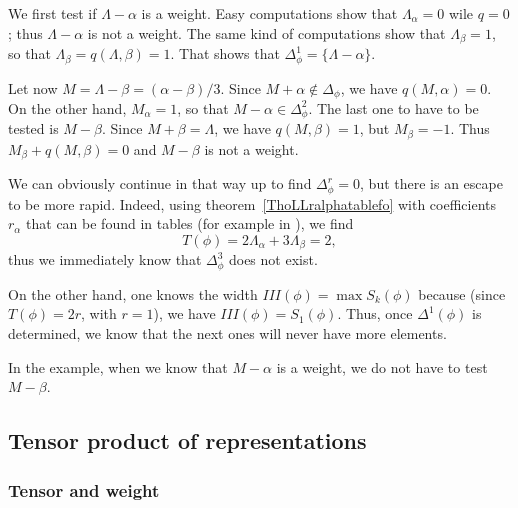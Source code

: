 We first test if $\Lambda-\alpha$ is a weight. Easy computations show that  $\Lambda_{\alpha}=0$ wile $q=0$; thus $\Lambda-\alpha$ is not a weight. The same kind of computations show that $\Lambda_{\beta}=1$, so that $\Lambda_{\beta}=q(\Lambda,\beta)=1$. That shows that $\Delta_{\phi}^1=\{ \Lambda-\alpha \}$.

Let now $M=\Lambda-\beta=(\alpha-\beta)/3$. Since $M+\alpha\notin\Delta_{\phi}$, we have $q(M,\alpha)=0$. On the other hand, $M_{\alpha}=1$, so that $M-\alpha\in\Delta_{\phi}^2$. The last one to have to be tested is $M-\beta$. Since $M+\beta=\Lambda$, we have $q(M,\beta)=1$, but $M_{\beta}=-1$. Thus $M_{\beta}+q(M,\beta)=0$ and $M-\beta$ is not a weight.

We can obviously continue in that way up to find $\Delta_{\phi}^r=0$, but there is an escape to be more rapid. Indeed, using theorem~\ref{ThoLLralphatablefo} with coefficients $r_{\alpha}$ that can be found in tables (for example in \cite{Wybourne}), we find
\begin{equation}
    T(\phi)=2\Lambda_{\alpha}+3\Lambda_{\beta}=2,
\end{equation}
thus we immediately know that $\Delta^3_{\phi}$ does not exist.

On the other hand, one knows the width $III(\phi)=\max S_k(\phi)$ because (since $T(\phi)=2r$, with $r=1$), we have $III(\phi)=S_1(\phi)$. Thus, once $\Delta^1(\phi)$ is determined, we know that the next ones will never have more elements.

In the example, when we know that $M-\alpha$ is a weight, we do not have to test $M-\beta$.

\label{LeTravail}

                    \subsection{Tensor product of representations}

                    \subsubsection{Tensor and weight}


